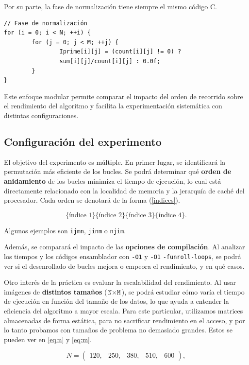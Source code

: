 \documentclass[11pt,a4paper,twoside]{article}
\theoremstyle{definition}
\begin{document}
	Por su parte, la fase de normalización tiene siempre el mismo código C.
	\begin{verbatim}
// Fase de normalización
for (i = 0; i < N; ++i) {
		for (j = 0; j < M; ++j) {
				Iprime[i][j] = (count[i][j] != 0) ?
				sum[i][j]/count[i][j] : 0.0f;
		}
}
	\end{verbatim}

	Este enfoque modular permite comparar el impacto del orden de recorrido sobre el rendimiento del algoritmo y facilita la experimentación sistemática con distintas configuraciones.
	
	
	\subsection{Configuración del experimento}
	
	El objetivo del experimento es múltiple. En primer lugar, se identificará la permutación más eficiente de los bucles. Se podrá determinar qué \textbf{orden de anidamiento} de los bucles minimiza el tiempo de ejecución, lo cual está directamente relacionado con la localidad de memoria y la jerarquía de caché del procesador. Cada orden se denotará de la forma (\ref{indices}).
	
	\begin{equation} \label{indices}
		\{\text{índice 1}\}\{\text{índice 2}\}\{\text{índice 3}\}\{\text{índice 4}\}.
	\end{equation}

	Algunos ejemplos son \texttt{ijmn}, \texttt{jinm} o \texttt{njim}.
	
	Además, se comparará el impacto de las \textbf{opciones de compilación}. Al analizar los tiempos y los códigos ensamblador con \texttt{-O1} y \texttt{-O1} \texttt{-funroll-loops}, se podrá ver si el desenrollado de bucles mejora o empeora el rendimiento, y en qué casos.
	
	Otro interés de la práctica es evaluar la escalabilidad del rendimiento. Al usar imágenes de \textbf{distintos tamaños} ($\texttt{N} \times \texttt{M}$), se podrá estudiar cómo varía el tiempo de ejecución en función del tamaño de los datos, lo que ayuda a entender la eficiencia del algoritmo a mayor escala. Para este particular, utilizamos matrices almacenadas de forma estática, para no sacrificar rendimiento en el acceso, y por lo tanto probamos con tamaños de problema no demasiado grandes. Estos se pueden ver en \ref{eq:n} y \ref{eq:m}.
	
	\begin{equation} \label{eq:n}
		N = \left( \begin{matrix}
			120, & 250, & 380, & 510, & 600
		\end{matrix} \right),
	\end{equation}
\end{document}
